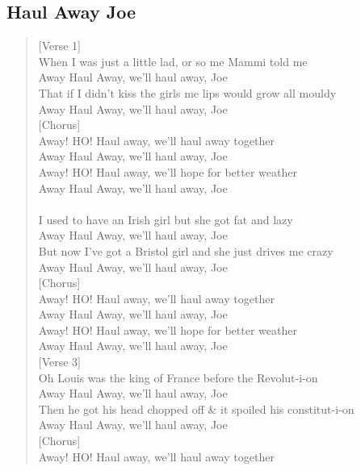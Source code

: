 \documentclass[11pt]{article}
\begin{document}
\subsection{Haul Away Joe}
\label{sec:org03724d8}
\begin{verse}
[Verse 1]\\
When I was just a little lad, or so me Mammi told me\\
Away Haul Away, we'll haul away, Joe\\
That if I didn't kiss the girls me lips would grow all mouldy\\
Away Haul Away, we'll haul away, Joe\\
\vspace*{1em}
[Chorus]\\
Away! HO! Haul away, we'll haul away together\\
Away Haul Away, we'll haul away, Joe\\
Away! HO! Haul away, we'll hope for better weather\\
Away Haul Away, we'll haul away, Joe\\
[Verse 2]\\
I used to have an Irish girl but she got fat and lazy\\
Away Haul Away, we'll haul away, Joe\\
But now I've got a Bristol girl and she just drives me crazy\\
Away Haul Away, we'll haul away, Joe\\
\vspace*{1em}
[Chorus]\\
Away! HO! Haul away, we'll haul away together\\
Away Haul Away, we'll haul away, Joe\\
Away! HO! Haul away, we'll hope for better weather\\
Away Haul Away, we'll haul away, Joe\\
\vspace*{1em}
[Verse 3]\\
Oh Louis was the king of France before the Revolut-i-on\\
Away Haul Away, we'll haul away, Joe\\
Then he got his head chopped off \& it spoiled his constitut-i-on\\
Away Haul Away, we'll haul away, Joe\\
\vspace*{1em}
[Chorus]\\
Away! HO! Haul away, we'll haul away together\\

\end{verse}
\end{document}
